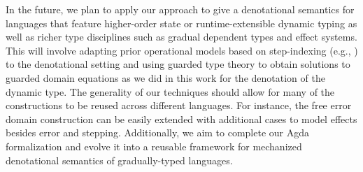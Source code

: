 In the future, we plan to apply our approach to give a denotational semantics
for languages that feature higher-order state or runtime-extensible dynamic
typing \cite{DBLP:journals/corr/abs-2210-02169} as well as richer type
disciplines such as gradual dependent types and effect systems. This will
involve adapting prior operational models based on step-indexing (e.g.,
\cite{new-giovannini-licata-2022}) to the denotational setting and using guarded
type theory to obtain solutions to guarded domain equations as we did in this
work for the denotation of the dynamic type. The generality of our techniques
should allow for many of the constructions to be reused across different
languages. For instance, the free error domain construction can be easily
extended with additional cases to model effects besides error and stepping.
Additionally, we aim to complete our Agda formalization and evolve it into a
reusable framework for mechanized denotational semantics of gradually-typed
languages.


